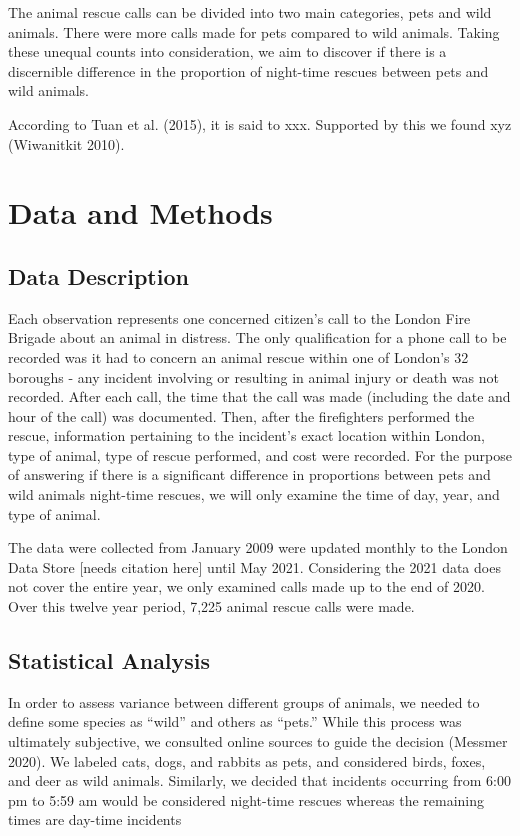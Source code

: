 \documentclass[
]{article}
\begin{document}
The animal rescue calls can be divided into two main categories, pets
and wild animals. There were more calls made for pets compared to wild
animals. Taking these unequal counts into consideration, we aim to
discover if there is a discernible difference in the proportion of
night-time rescues between pets and wild animals.

According to Tuan et al. (2015), it is said to xxx. Supported by this we
found xyz (Wiwanitkit 2010).

\hypertarget{data-and-methods}{%
\section{Data and Methods}\label{data-and-methods}}

\hypertarget{data-description}{%
\subsection{Data Description}\label{data-description}}

Each observation represents one concerned citizen's call to the London
Fire Brigade about an animal in distress. The only qualification for a
phone call to be recorded was it had to concern an animal rescue within
one of London's 32 boroughs - any incident involving or resulting in
animal injury or death was not recorded. After each call, the time that
the call was made (including the date and hour of the call) was
documented. Then, after the firefighters performed the rescue,
information pertaining to the incident's exact location within London,
type of animal, type of rescue performed, and cost were recorded. For
the purpose of answering if there is a significant difference in
proportions between pets and wild animals night-time rescues, we will
only examine the time of day, year, and type of animal.

The data were collected from January 2009 were updated monthly to the
London Data Store {[}needs citation here{]} until May 2021. Considering
the 2021 data does not cover the entire year, we only examined calls
made up to the end of 2020. Over this twelve year period, 7,225 animal
rescue calls were made.

\hypertarget{statistical-analysis}{%
\subsection{Statistical Analysis}\label{statistical-analysis}}

In order to assess variance between different groups of animals, we
needed to define some species as ``wild'' and others as ``pets.'' While
this process was ultimately subjective, we consulted online sources to
guide the decision (Messmer 2020). We labeled cats, dogs, and rabbits as
pets, and considered birds, foxes, and deer as wild animals. Similarly,
we decided that incidents occurring from 6:00 pm to 5:59 am would be
considered night-time rescues whereas the remaining times are day-time
incidents
\end{document}
